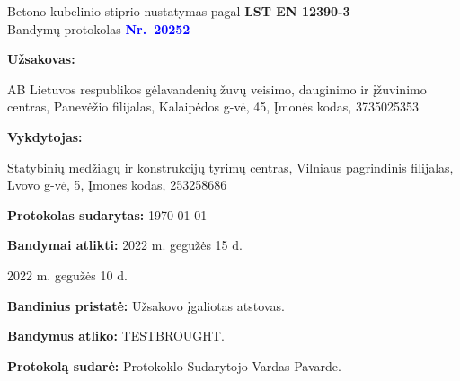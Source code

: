 \documentclass[a4paper, 12pt]{article}
\newcommand{\nin}{\noindent}
\begin{document}
\begin{center}
	{\Large Betono kubelinio stiprio nustatymas pagal {\bf LST EN 12390-3}\\
		Bandymų protokolas {\bf \Large \textcolor{blue}{Nr.~20252}}\\ %
	}
\end{center}

{\hspace{2.5cm} {\bf Užsakovas:} \hfill \parbox{12.0cm}{AB Lietuvos respublikos gėlavandenių žuvų veisimo, dauginimo ir įžuvinimo centras, Panevėžio filijalas, Kalaipėdos g-vė, 45, Įmonės kodas, 3735025353}} %

\vspace{0.5cm}

{\hspace{2.5cm} {\bf Vykdytojas:} \hfill \parbox{12.0cm}{Statybinių medžiagų ir konstrukcijų tyrimų centras, Vilniaus pagrindinis filijalas, Lvovo g-vė, 5, Įmonės kodas, 253258686}} %

\vspace{0.5cm}
\hspace{5.25cm} {\bf Protokolas sudarytas:} { \today } %

\hspace{5.25cm} {\bf Bandymai atlikti:} {2022 m. gegužės 15 d.} %

\hspace{5.25cm} \nin {\bf Bandiniai gauti:} {2022 m. gegužės 10 d.} %

\vspace{0.5cm}
\hspace{5.25cm} {\bf Bandinius pristatė:} {Užsakovo įgaliotas atstovas}. %

\hspace{5.25cm} {\bf Bandymus atliko:} {{{TESTBROUGHT}}}. %

\hspace{5.25cm} {\bf Protokolą sudarė:} {Protokoklo-Sudarytojo-Vardas-Pavarde}.%
\end{document}
